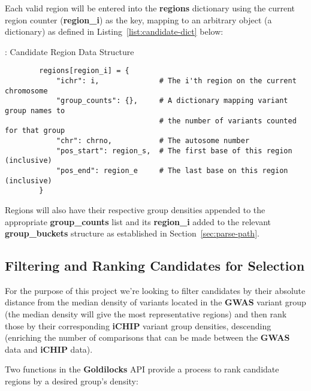 Each valid region will be entered into the \textbf{regions} dictionary using
the current region counter (\textbf{region\_i}) as the key, mapping to an
arbitrary object (a dictionary) as defined in Listing~\ref{list:candidate-dict}
below:

\begin{listing}[H]
    \caption[candidate-dict]{: Candidate Region Data Structure}
    \label{list:candidate-dict}
    \begin{verbatim}
        regions[region_i] = {
            "ichr": i,              # The i'th region on the current chromosome
            "group_counts": {},     # A dictionary mapping variant group names to
                                    # the number of variants counted for that group
            "chr": chrno,           # The autosome number
            "pos_start": region_s,  # The first base of this region (inclusive)
            "pos_end": region_e     # The last base on this region (inclusive)
        }
    \end{verbatim}
\end{listing}

Regions will also have their respective group densities appended to the
appropriate \textbf{group\_counts} list and its \textbf{region\_i} added to the
relevant \textbf{group\_buckets} structure as established in
Section~\ref{sec:parse-path}.


\subsection{Filtering and Ranking Candidates for Selection}
\label{sec:filter-rank}

For the purpose of this project we're looking to filter candidates by their
absolute distance from the median density of variants located in the
\textbf{GWAS} variant group (the median density will give the most representative
regions) and then rank those by their corresponding \textbf{iCHIP} variant group
densities, descending (enriching the number of comparisons that can be made
between the \textbf{GWAS} data and \textbf{iCHIP} data).

Two functions in the \textbf{Goldilocks} API provide a process to rank candidate
regions by a desired group's density:

